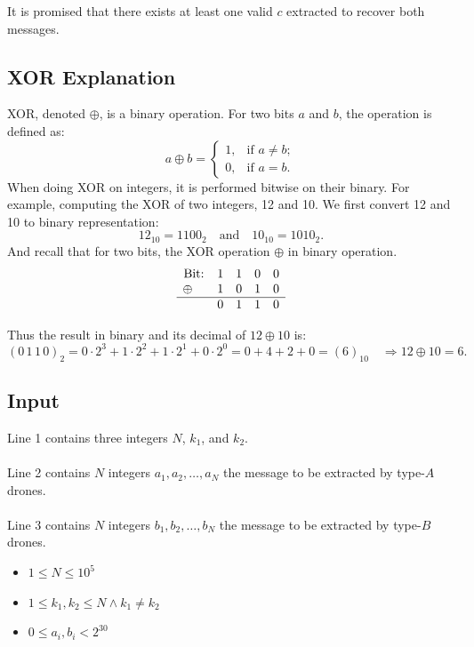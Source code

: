 \documentclass[12pt,a4paper]{article}
\begin{document}
\noindent
It is promised that there exists at least one valid $c$ extracted to recover both messages.

\subsection*{\fontsize{16}{12}XOR Explanation}
XOR, denoted $\oplus$, is a binary operation. For two bits $a$ and $b$, the operation is defined as:
    \[
    a \oplus b =
    \begin{cases}
    1, & \text{if } a \neq b; \\
    0, & \text{if } a = b.
    \end{cases}
    \]
\noindent
When doing XOR on integers, it is performed bitwise on their binary.
For example, computing the XOR of two integers, 12 and 10.
We first convert 12 and 10 to binary representation:
\[
12_{10} = 1100_2 \quad \text{and} \quad 10_{10} = 1010_2.
\]
\noindent
And recall that for two bits, the XOR operation $\oplus$ in binary operation.
\[
\begin{array}{ccccc}
\text{Bit:} & 1 & 1 & 0 & 0 \\
\oplus \quad & 1 & 0 & 1 & 0 \\
\hline&0&1&1&0 \\
\end{array}
\]

\noindent
Thus the result in binary and its decimal of $12\oplus10$ is:
\[
(0\,1\,1\,0)_2 = 0\cdot2^3 + 1\cdot2^2 + 1\cdot2^1 + 0\cdot2^0 = 0 + 4 + 2 + 0 = (6)_{10}\quad
\Rightarrow 12 \oplus 10 = 6.
\]

\subsection*{\fontsize{16}{12}Input}
Line 1 contains three integers $N$, $k_1$, and $k_2$.
\\\\
\noindent
Line 2 contains $N$ integers $a_1, a_2, \dots, a_N$ the message to be extracted by type-$A$ drones.
\\\\
\noindent
Line 3 contains $N$ integers $b_1, b_2, \dots, b_N$ the message to be extracted by type-$B$ drones.

\begin{itemize}
    \item $1 \leq N \leq 10^5$
    \item $1 \leq k_1, k_2 \leq N\wedge k_1 \ne k_2$
    \item $0 \leq a_i, b_i < 2^{30}$
\end{itemize}
\end{document}
